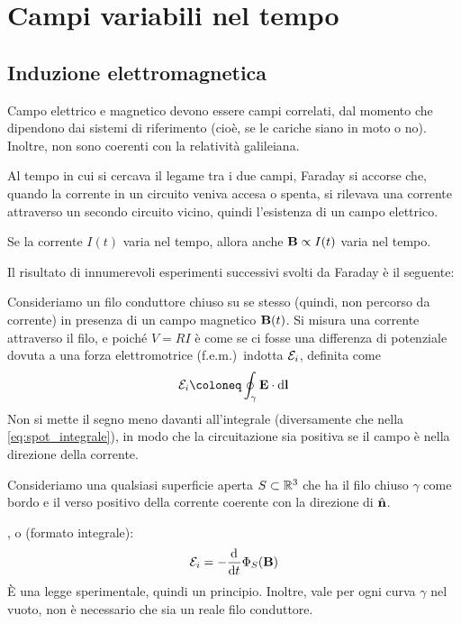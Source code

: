 \chapter{Campi variabili nel tempo}

\section{Induzione elettromagnetica}

Campo elettrico e magnetico devono essere campi correlati, dal momento che dipendono dai sistemi di riferimento (cioè, se le cariche siano in moto o no).
Inoltre, non sono coerenti con la relatività galileiana.

Al tempo in cui si cercava il legame tra i due campi, Faraday si accorse che, quando la corrente in un circuito veniva accesa o spenta, si rilevava una corrente attraverso un secondo circuito vicino, quindi l'esistenza di un campo elettrico.

Se la corrente $I(t)$ varia nel tempo, allora anche $\mathbf{B} \propto I(t)$ varia nel tempo.

Il risultato di innumerevoli esperimenti successivi svolti da Faraday è il seguente:

Consideriamo un filo conduttore chiuso su se stesso (quindi, non percorso da corrente) in presenza di un campo magnetico $\mathbf{B}(t)$.
Si misura una corrente attraverso il filo, e poiché $V = RI$ è come se ci fosse una differenza di potenziale dovuta a una forza elettromotrice (f.e.m.)\ indotta $\mathcal{E}_i$, definita come
\begin{equation}
    \fem_i \coloneq \oint_\gamma \E \lde
\end{equation}
Non si mette il segno meno davanti all'integrale (diversamente che nella \eqref{eq:spot_integrale}), in modo che la circuitazione sia positiva se il campo è nella direzione della corrente.

Consideriamo una qualsiasi superficie aperta $S \subset \mathbb{R}^3$ che ha il filo chiuso $\gamma$ come bordo e il verso positivo della corrente coerente con la direzione di $\hat{\mathbf{n}}$.

, o  (formato integrale):
\begin{equation}
    \fem_i = - \der{t} \Phi_S(\B)
\end{equation}
È una legge sperimentale, quindi un principio.
Inoltre, vale per ogni curva $\gamma$ nel vuoto, non è necessario che sia un reale filo conduttore.

